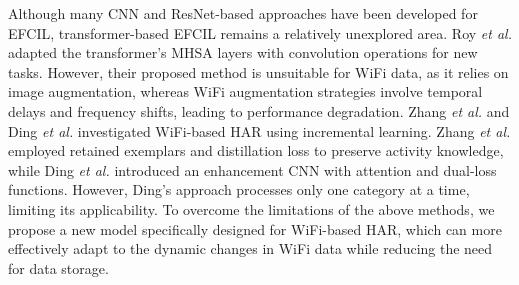 Although many CNN and ResNet-based approaches have been developed for EFCIL, transformer-based EFCIL remains a relatively unexplored area.
Roy \textit{et al.} \cite{roy2023exemplar} adapted the transformer's MHSA layers with convolution operations for new tasks. However, their proposed method is unsuitable for WiFi data, as it relies on image augmentation, whereas WiFi augmentation strategies involve temporal delays and frequency shifts, leading to performance degradation.
Zhang \textit{et al.} \cite{zhang2023csi} and Ding \textit{et al.} \cite{ding2023passive} investigated WiFi-based HAR using incremental learning. Zhang \textit{et al.} employed retained exemplars and distillation loss to preserve activity knowledge, while Ding \textit{et al.} introduced an enhancement CNN with attention and dual-loss functions. However, Ding's approach processes only one category at a time, limiting its applicability.
To overcome the limitations of the above methods, we propose a new model specifically designed for WiFi-based HAR, which can more effectively adapt to the dynamic changes in WiFi data while reducing the need for data storage.

